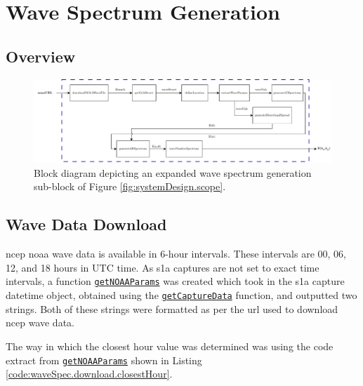 \section{Wave Spectrum Generation} \label{sec:systemDesign.waveSpectrum}



\subsection{Overview} \label{subsec:systemDesign.waveSpectrum.Overview}

\begin{figure}[H]
    \centering
    \includegraphics[width=.95\linewidth]{Figures/PipelineDesign/wave_spectrum.pdf}
    \caption{Block diagram depicting an expanded wave spectrum generation sub-block of Figure \ref{fig:systemDesign.scope}.}
    \label{fig:systemDesign.wavesSpectrum.blockDiagram}
\end{figure}

\subsection{Wave Data Download} \label{subsec:systemDesign.waveSpectrum.download}

\acs{ncep} \acs{noaa} wave data is available in 6-hour intervals. These intervals are 00, 06, 12, and 18 hours in UTC time. As \acs{s1a} captures are not set to exact time intervals, a function \href{https://github.com/JNSRYA006/sar-parameter-extraction-pipeline/blob/main/functions/waveSpectra/generateSingleJONSWAP.m}{\lstinline{getNOAAParams}} was created which took in the \acs{s1a} capture datetime object, obtained using the \href{https://github.com/JNSRYA006/sar-parameter-extraction-pipeline/blob/main/functions/waveSpectra/generateSingleJONSWAP.m}{\lstinline{getCaptureData}} function, and outputted two strings. Both of these strings were formatted as per the \acs{url} used to download \acs{ncep} wave data. 

The way in which the closest hour value was determined was using the code extract from \href{https://github.com/JNSRYA006/sar-parameter-extraction-pipeline/blob/main/functions/waveSpectra/generateSingleJONSWAP.m}{\lstinline{getNOAAParams}} shown in Listing \ref{code:waveSpec.download.closestHour}. 

